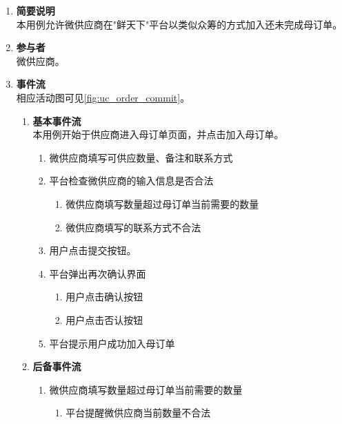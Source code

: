 \begin{enumerate}
    \item \textbf{简要说明}  \\ 本用例允许微供应商在"鲜天下"平台以类似众筹的方式加入还未完成母订单。
    \item \textbf{参与者} \\ 微供应商。
    \item \textbf{事件流} \\ 相应活动图可见\autoref{fig:uc_order_commit}。
    \begin{enumerate} 
        \item \textbf{基本事件流} \\ 本用例开始于供应商进入母订单页面，并点击加入母订单。
        \begin{enumerate}
            \item 微供应商填写可供应数量、备注和联系方式

            \item 平台检查微供应商的输入信息是否合法
            \begin{enumerate}
                \item 微供应商填写数量超过母订单当前需要的数量
                \item 微供应商填写的联系方式不合法
            \end{enumerate}

            \item 用户点击提交按钮。

            \item 平台弹出再次确认界面
            \begin{enumerate}
                \item 用户点击确认按钮
                \item 用户点击否认按钮
            \end{enumerate}

            \item 平台提示用户成功加入母订单
            

        \end{enumerate}
        \item \textbf{后备事件流}
        \begin{enumerate}
            \item 微供应商填写数量超过母订单当前需要的数量
            \begin{enumerate}
                \item 平台提醒微供应商当前数量不合法
            \end{enumerate}


\end{enumerate}
\end{enumerate}
\end{enumerate}
